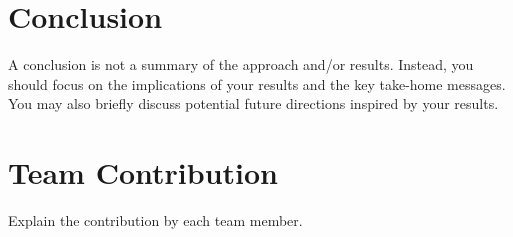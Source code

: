 \documentclass[10pt, conference]{IEEEtran}
\begin{document}



\section{Conclusion}
\label{sec:conclusion}

A conclusion is not a summary of the approach and/or results. Instead, you should focus on the implications of your results and the key take-home messages. You may also briefly discuss potential future directions inspired by your results.

\section{Team Contribution}
\label{sec:contribution}
Explain the contribution by each team member.

\balance


\end{document}

